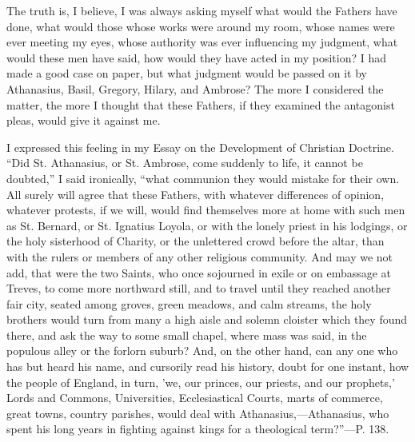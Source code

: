 The truth is, I believe, I was always asking myself what would the
Fathers have done, what would those whose works were around my room,
whose names were ever meeting my eyes, whose authority was ever
influencing my judgment, what would these men have said, how would
they have acted in my position? I had made a good case on paper, but
what judgment would be passed on it by Athanasius, Basil, Gregory,
Hilary, and Ambrose? The more I considered the matter, the more I
thought that these Fathers, if they examined the antagonist pleas,
would give it against me.

I expressed this feeling in my Essay on the Development of
Christian Doctrine. ``Did St. Athanasius, or St. Ambrose, come
suddenly to life, it cannot be doubted,'' I said ironically,
``what communion they would mistake for their own. All surely will
agree that these Fathers, with whatever differences of opinion,
whatever protests, if we will, would find themselves more at home with
such men as St. Bernard, or St. Ignatius Loyola, or with the lonely
priest in his lodgings, or the holy sisterhood of Charity, or the
unlettered crowd before the altar, than with the rulers or members of
any other religious community. And may we not add, that were the two
Saints, who once sojourned in exile or on embassage at Treves, to come
more northward still, and to travel until they reached another fair
city, seated among groves, green meadows, and calm streams, the holy
brothers would turn from many a high aisle and solemn cloister which
they found there, and ask the way to some small chapel, where mass was
said, in the populous alley or the forlorn suburb? And, on the other
hand, can any one who has but heard his name, and cursorily read his
history, doubt for one instant, how the people of England, in turn,
'we, our princes, our priests, and our prophets,' Lords and Commons,
Universities, Ecclesiastical Courts, marts of commerce, great towns,
country parishes, would deal with Athanasius,—Athanasius, who spent
his long years in fighting against kings for a theological term?''—P.
138.

